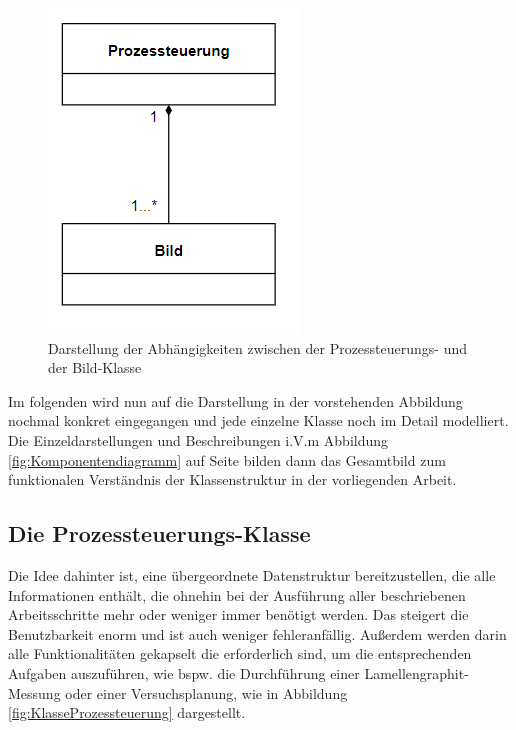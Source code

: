 \documentclass[
fontsize=10pt, 
listof = totoc,
parskip = half	
]{report}
\begin{document}
\begin{figure}[H]
	\centering
	\includegraphics[scale=0.8]{pics/class_diagram_overview}
	\caption{Darstellung der Abhängigkeiten zwischen der Prozessteuerungs- und der Bild-Klasse}
	\label{fig:KlassendiagrammUeberblick}
\end{figure}

\noindent Im folgenden wird nun auf die Darstellung in der vorstehenden Abbildung nochmal konkret eingegangen und jede einzelne Klasse noch im Detail modelliert. Die Einzeldarstellungen und Beschreibungen i.V.m Abbildung \ref{fig:Komponentendiagramm} auf Seite \pageref{fig:Komponentendiagramm} bilden dann das Gesamtbild zum funktionalen Verständnis der Klassenstruktur in der vorliegenden Arbeit.


\subsection{Die Prozessteuerungs-Klasse}

Die Idee dahinter ist, eine übergeordnete Datenstruktur bereitzustellen, die alle Informationen enthält, die ohnehin bei der Ausführung aller beschriebenen Arbeitsschritte mehr oder weniger immer benötigt werden. Das steigert die Benutzbarkeit enorm und ist auch weniger fehleranfällig. Außerdem werden darin alle Funktionalitäten gekapselt die erforderlich sind, um die entsprechenden Aufgaben auszuführen, wie bspw. die Durchführung einer Lamellengraphit-Messung oder einer Versuchsplanung, wie in Abbildung \ref{fig:KlasseProzessteuerung} dargestellt.
\end{document}

